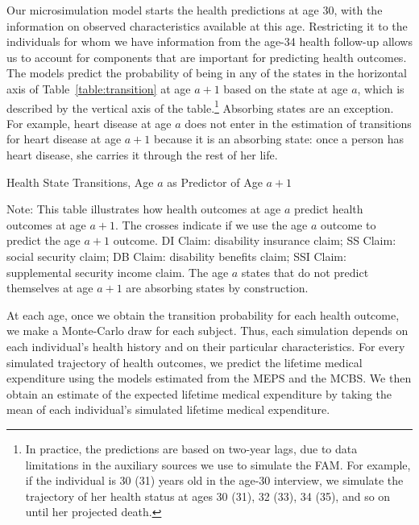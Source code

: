 Our microsimulation model starts the health predictions at age 30, with the information on observed characteristics available at this age. Restricting it to the individuals for whom we have information from the age-34 health follow-up allows us to account for components that are important for predicting health outcomes. The models predict the probability of being in any of the states in the horizontal axis of Table~\ref{table:transition} at age $a+1$ based on the state at age $a$, which is described by the vertical axis of the table.\footnote{In practice, the predictions are based on two-year lags, due to data limitations in the auxiliary sources we use to simulate the FAM. For example, if the individual is 30 (31) years old in the age-30 interview, we simulate the trajectory of her health status at ages 30 (31), 32 (33), 34 (35), and so on until her projected death.} Absorbing states are an exception. For example, heart disease at age $a$ does not enter in the estimation of transitions for heart disease at age $a+1$ because it is an absorbing state: once a person has heart disease, she carries it through the rest of her life.

\begin{table}
\begin{threeparttable}
\caption{Health State Transitions, Age $a$ as Predictor of Age $a+1$}\label{table:transition}
\scriptsize

\begin{tablenotes}
\footnotesize
\item Note: This table illustrates how health outcomes at age $a$ predict health outcomes at age $a+1$. The crosses indicate if we use the age $a$ outcome to predict the age $a+1$ outcome. DI Claim: disability insurance claim; SS Claim: social security claim; DB Claim: disability benefits claim; SSI Claim: supplemental security income claim. The age $a$ states that do not predict themselves at age $a+1$ are absorbing states by construction.
\end{tablenotes}
\end{threeparttable}
\end{table}

At each age, once we obtain the transition probability for each health outcome, we make a Monte-Carlo draw for each subject. Thus, each simulation depends on each individual's health history and on their particular characteristics. For every simulated trajectory of health outcomes, we predict the lifetime medical expenditure using the models estimated from the MEPS and the MCBS. We then obtain an estimate of the expected lifetime medical expenditure by taking the mean of each individual's simulated lifetime medical expenditure.

